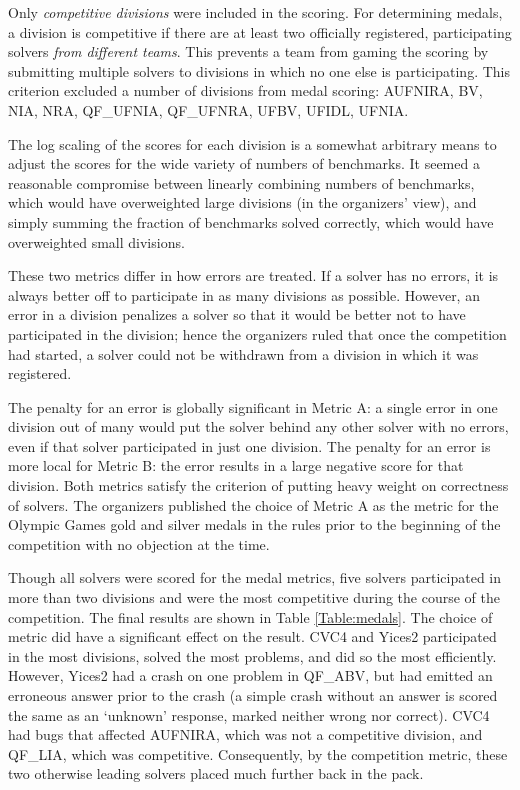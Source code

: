 \documentclass[twosize,11pt]{article}
\begin{document}
Only \textit{competitive divisions} were included in the scoring. For determining medals, a division is competitive if there are at least two officially registered, participating solvers \textit{from different teams}. This prevents a team from gaming the scoring by submitting multiple solvers to divisions in which no one else is participating. This criterion excluded a number of divisions from medal scoring: AUFNIRA, BV, NIA, NRA, QF\_UFNIA, QF\_UFNRA, UFBV, UFIDL, UFNIA.

The log scaling of the scores for each division is a somewhat arbitrary means to adjust the scores for the wide variety of numbers of benchmarks. It seemed a reasonable compromise between linearly combining numbers of benchmarks, which would have overweighted large divisions (in the organizers' view), and simply summing the fraction of benchmarks solved correctly, which would have overweighted small divisions.

These two metrics differ in how errors are treated. If a solver has no errors, it is always better off to participate in as many divisions as possible. However, an error in a division penalizes a solver so that it would be better not to have participated in the division; hence the organizers ruled that once the competition had started, a solver could not be withdrawn from a division in which it was registered.

The penalty for an error is globally significant in Metric A: a single error in one division out of many would put the solver behind any other solver with no errors, even if that solver participated in just one division. The penalty for an error is more local for Metric B: the error results in a large negative score for that division. Both metrics satisfy the criterion of putting heavy weight on correctness of solvers.
The organizers published the choice of Metric A as the metric for the Olympic Games gold and silver medals in the rules prior to the beginning of the competition with no objection at the time.

Though all solvers were scored for the medal metrics, five solvers participated in more than two divisions and were the most competitive during the course of the competition. The final results are shown in Table \ref{Table:medals}. The choice of metric did have a significant effect on the result. CVC4 and Yices2 participated in the most divisions, solved the most problems, and did so the most efficiently. However, Yices2 had a crash on one problem in QF\_ABV, but had emitted an erroneous answer prior to the crash (a simple crash without an answer is scored the same as an `unknown' response, marked neither wrong nor correct). CVC4 had bugs that affected AUFNIRA, which was not a competitive division, and QF\_LIA,
which was competitive. Consequently, by the competition metric, these two otherwise leading solvers placed much further back in the pack.
\end{document}
